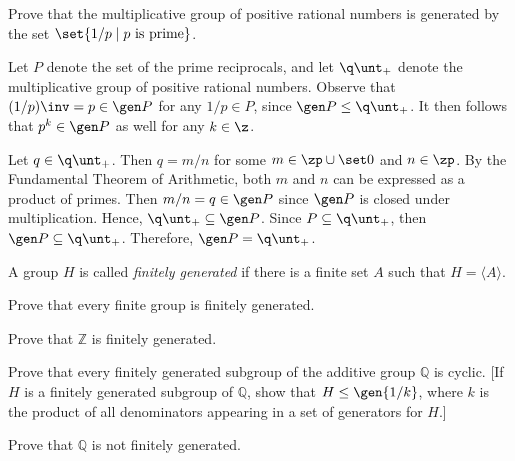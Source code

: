 \begin{exercise}\label{ex2.4.13}
    Prove that the multiplicative group of positive rational numbers is generated by the set $\set{1/p \mid p \text{ is prime}}$.
\end{exercise}

\begin{sol}
    Let $P$ denote the set of the prime reciprocals, and let $\q\unt_+$ denote the multiplicative group of positive rational numbers. Observe that $(1/p)\inv = p \in \gen P$ for any $1/p \in P$, since $\gen P \leq \q\unt_+$. It then follows that $p^k \in \gen P$ as well for any $k \in \z$.

    Let $q \in \q\unt_+$. Then $q = m/n$ for some $m \in \zp \cup \set 0$ and $n \in \zp$. By the Fundamental Theorem of Arithmetic, both $m$ and $n$ can be expressed as a product of primes. Then $m/n = q \in \gen P$ since $\gen P$ is closed under multiplication. Hence, $\q\unt_+ \subseteq \gen P$. Since $P \subseteq \q\unt_+$, then $\gen P \subseteq \q\unt_+$. Therefore, $\gen P = \q\unt_+$.
\end{sol}


\begin{specialexercise}\label{ex2.4.14}
    A group $H$ is called \emph{finitely generated} if there is a finite set $A$ such that $H=\langle A\rangle$.
    \begin{subproblems}
        \item Prove that every finite group is finitely generated.
        \item Prove that $\mathbb{Z}$ is finitely generated.
        \item Prove that every finitely generated subgroup of the additive group $\mathbb{Q}$ is cyclic. [If $H$ is a finitely generated subgroup of $\mathbb{Q}$, show that $H \leq \gen{1/k}$, where $k$ is the product of all denominators appearing in a set of generators for $H$.]
        \item Prove that $\mathbb{Q}$ is not finitely generated.
    \end{subproblems}
\end{specialexercise}

